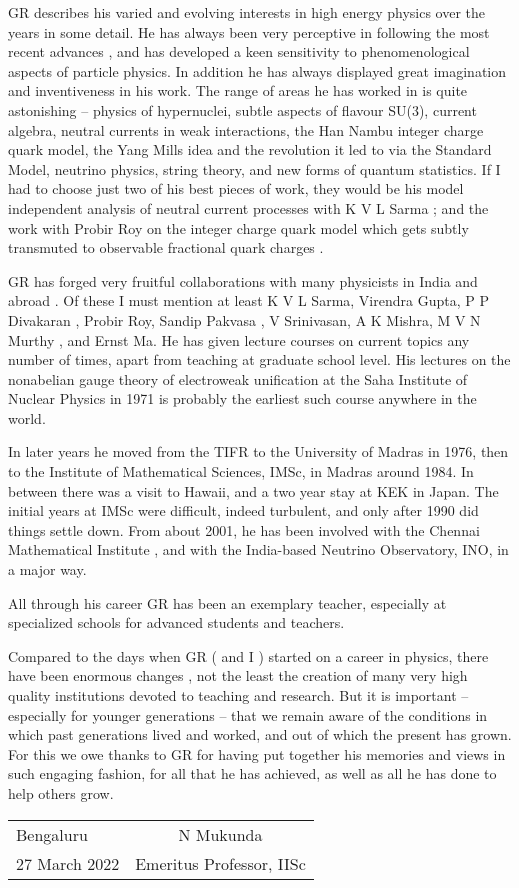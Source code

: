GR describes his varied and evolving interests in high energy physics 
over the years in some detail. He has always been very perceptive in 
following the most recent advances , and has developed a keen 
sensitivity to phenomenological aspects of particle physics. In 
addition he has always displayed great imagination and inventiveness in 
his work. The range of areas he has worked in is quite astonishing – 
physics of hypernuclei, subtle aspects of flavour SU(3), current 
algebra, neutral currents in weak interactions, the Han Nambu integer 
charge quark model, the Yang Mills idea and the revolution it led to 
via the Standard Model, neutrino physics, string theory, and new forms 
of quantum statistics. If I had to choose just two of his best pieces 
of work, they would be his model independent analysis of neutral 
current processes with K V L Sarma ; and the work with Probir Roy on 
the integer charge quark model which gets subtly transmuted to 
observable fractional quark charges .

GR has forged very fruitful collaborations with many physicists in 
India and abroad . Of these I must mention at least K V L Sarma, 
Virendra Gupta, P P Divakaran , Probir Roy, Sandip Pakvasa , V 
Srinivasan, A K Mishra, M V N Murthy , and Ernst Ma. He has given 
lecture courses on current topics any number of times, apart from 
teaching at graduate school level. His lectures on the nonabelian gauge 
theory of electroweak unification at the Saha Institute of Nuclear 
Physics in 1971 is probably the earliest such course anywhere in the 
world.

In later years he moved from the TIFR to the University of Madras in 
1976, then to the Institute of Mathematical Sciences, IMSc, in Madras 
around 1984. In between there was a visit to Hawaii, and a two year 
stay at KEK in Japan. The initial years at IMSc were difficult, indeed 
turbulent, and only after 1990 did things settle down. From about 2001, 
he has been involved with the Chennai Mathematical Institute , and with 
the India-based Neutrino Observatory, INO, in a major way.

All through his career GR has been an exemplary teacher, especially at 
specialized schools for advanced students and teachers.  

Compared to the days when GR ( and I ) started on a career in physics, 
there have been enormous changes , not the least the creation of many 
very high quality institutions devoted to teaching and research. But it 
is important – especially for younger generations – that we remain 
aware of the conditions in which past generations lived and worked, 
and out of which the present has grown. For this we owe thanks to GR 
for having put together his memories and views in such engaging fashion, 
for all that he has achieved, as well as all he has done to help 
others grow.
\vskip 1cm
\begin{flushleft}
\begin{tabular}{l@{\phantom{WWWWWWWWW}}c}
Bengaluru & \quad N Mukunda\\
27 March 2022 & Emeritus Professor, IISc
\end{tabular}
\end{flushleft}
